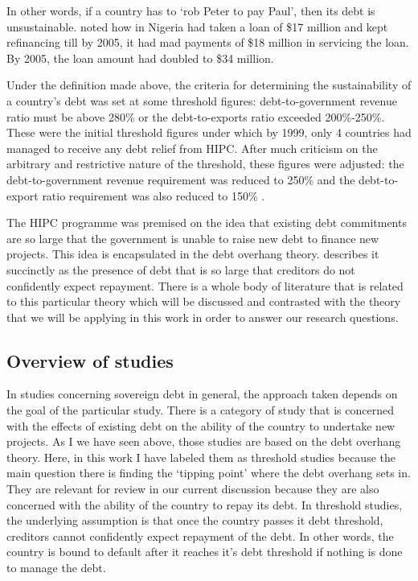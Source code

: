 \documentclass[14pt, a4paper]{article}
\begin{document}
	In other words, if a country has to  `rob Peter to pay Paul', then its debt is unsustainable.  noted how in Nigeria had taken a loan of \$17 million and kept refinancing till by 2005, it had mad payments of \$18 million in servicing the loan. By 2005, the loan amount had doubled to \$34 million. 
	
	Under the definition made above, the criteria for determining the sustainability of a country's debt was set at some threshold figures: debt-to-government revenue ratio must be above 280\% or the debt-to-exports ratio exceeded 200\%-250\%. These were the initial threshold figures under which by 1999, only 4 countries had managed to receive any debt relief from HIPC. After much criticism on the arbitrary and restrictive nature of the threshold, these figures were adjusted: the debt-to-government revenue requirement was reduced to 250\% and the debt-to-export ratio requirement was also reduced to 150\% \cite{carrasco2007foreign}.
	
	The HIPC programme was premised on the idea that existing debt commitments are so large that the government is unable to raise new debt to finance new projects. This idea is encapsulated in the debt overhang theory.  describes it succinctly as the presence of debt that is so large that creditors do not confidently expect repayment. There is a whole body of literature that is related to this particular theory which will be discussed and contrasted with the theory that we will be applying in this work in order to answer our research questions.
	
	\subsection{Overview of studies}
	In studies concerning sovereign debt in general, the approach taken depends on the goal of the particular study. There is a category of study that is concerned with the effects of existing debt on the ability of the country to undertake new projects. As I we have seen above, those studies are based on the debt overhang theory. Here, in this work I have labeled them as threshold studies because the main question there is finding the `tipping point' where the debt overhang sets in. They are relevant for review in our current discussion because they are also concerned with the ability of the country to repay its debt. In threshold studies, the underlying assumption is that once the country passes it debt threshold, creditors cannot confidently expect repayment of the debt. In other words, the country is bound to default after it reaches it's debt threshold if nothing is done to manage the debt. 
	
\end{document}
